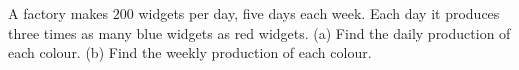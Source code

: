A factory makes $200$ widgets per day, five days each week. Each day it produces three times as many blue widgets as red widgets. (a) Find the daily production of each colour. (b) Find the weekly production of each colour.
